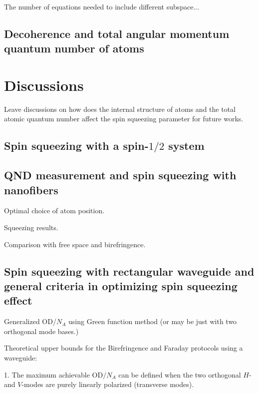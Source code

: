 \documentclass[preprint,aps,pra,onecolumn,superscriptaddress]{revtex4-1} %
\newcommand{\comment}[1]{{\color{Maroon} #1}}
\begin{document}
The number of equations needed to include different subspace...

\subsection{Decoherence and total angular momentum quantum number of atoms}

\section{Discussions} \label{Sec::Discussions}
\comment{Leave discussions on how does the internal structure of atoms and the total atomic quantum number affect the spin squeezing parameter for future works.}


\subsection{Spin squeezing with a spin-$1/2$ system} \label{Sec::squeezingwithspinhalfsystems}


\subsection{QND measurement and spin squeezing with nanofibers} \label{Sec::Nanofiber}

Optimal choice of atom position.

Squeezing results.

Comparison with free space and birefringence.


\subsection{Spin squeezing with rectangular waveguide and general criteria in optimizing spin squeezing effect} \label{Sec::Waveguide}

Generalized OD/$N_A$ using Green function method (or may be just with two orthogonal mode bases.)

Theoretical upper bounds for the Birefringence and Faraday protocols using a waveguide:

1. The maximum achievable OD$ /N_A $ can be defined when the two orthogonal $ H $- and $ V $-modes are purely linearly polarized (transverse modes).
\end{document}
